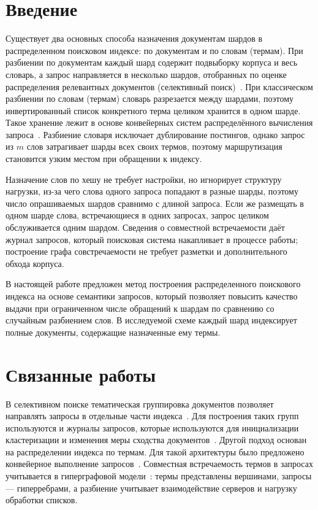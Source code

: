 \documentclass[10pt, a4paper, twoside]{article}
\begin{document}
\clearpage
\begin{ntvbody}

\section{Введение}

Существует два основных способа назначения документам шардов в распределенном поисковом индексе: по документам и по словам (термам).
При разбиении по документам каждый шард содержит подвыборку корпуса и весь словарь, а запрос направляется в несколько шардов, отобранных по оценке распределения релевантных документов (селективный поиск)~\cite{kulkarni2015,dai2016}.
При классическом разбиении по словам (термам) словарь разрезается между шардами, поэтому инвертированный список конкретного терма целиком хранится в одном шарде.
Такое хранение лежит в основе конвейерных систем распределённого вычисления запроса~\cite{moffat2007}.
Разбиение словаря исключает дублирование постингов, однако запрос из $m$ слов затрагивает шарды всех своих термов, поэтому маршрутизация становится узким местом при обращении к индексу.

Назначение слов по хешу не требует настройки, но игнорирует структуру нагрузки, из-за чего слова одного запроса попадают в разные шарды, поэтому число опрашиваемых шардов сравнимо с длиной запроса.
Если же размещать в одном шарде слова, встречающиеся в одних запросах, запрос целиком обслуживается одним шардом.
Сведения о совместной встречаемости даёт журнал запросов, который поисковая система накапливает в процессе работы; построение графа совстречаемости не требует разметки и дополнительного обхода корпуса.

В настоящей работе предложен метод построения распределенного поискового индекса на основе семантики запросов, который позволяет повысить качество выдачи при ограниченном числе обращений к шардам по сравнению со случайным разбиением слов.
В исследуемой схеме каждый шард индексирует полные документы, содержащие назначенные ему термы.

\section{Связанные работы}

В селективном поиске тематическая группировка документов позволяет направлять запросы в отдельные части индекса~\cite{kulkarni2015}.
Для построения таких групп используются и журналы запросов, которые используются для инициализации кластеризации и изменения меры сходства документов~\cite{dai2016}.
Другой подход основан на распределении индекса по термам.
Для такой архитектуры было предложено конвейерное выполнение запросов~\cite{moffat2007}.
Совместная встречаемость термов в запросах учитывается в гиперграфовой модели~\cite{cambazoglu2013}: термы представлены вершинами, запросы --- гиперребрами, а разбиение учитывает взаимодействие серверов и нагрузку обработки списков.


\end{ntvbody}
\end{document}
